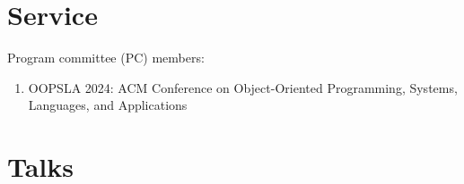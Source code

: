 \documentclass[letterpaper,11pt]{article}
\begin{document}


\section{Service}
Program committee (PC) members:
\begin{enumerate}
\item{OOPSLA 2024: ACM Conference on Object-Oriented Programming, Systems, Languages, and Applications}
\end{enumerate}


\section{Talks}
\end{document}
